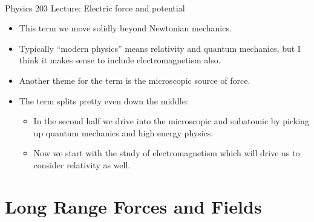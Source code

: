 \documentclass{article}
\begin{document}
\begin{center}
\LARGE{} \\[5mm]

\vskip 0.25cm
\small{\sf Physics 203 Lecture: Electric force and potential} \\[2mm]
\small{\sf }
\end{center}

%
\begin{itemize}

\item This term we move solidly beyond Newtonian mechanics.

\item Typically ``modern physics'' means relativity and quantum mechanics, but I think it makes sense to include electromagnetism also.

\item Another theme for the term is the microscopic source of force.

\item The term splits pretty even down the middle:
%
\begin{itemize}

\item In the second half we drive into the microscopic and subatomic by picking up quantum mechanics and high energy physics.

\item Now we start with the study of electromagnetism which will drive us to consider relativity as well.

\end{itemize}

\end{itemize}


\newpage
\section{Long Range Forces and Fields}

\end{document}
